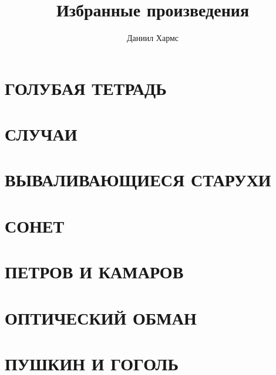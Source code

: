 \documentclass{article}
\begin{document}
\author{Даниил Хармс}
\title{Избранные произведения}
\date{}
\maketitle

\section{ГОЛУБАЯ ТЕТРАДЬ}

\section{СЛУЧАИ}
                 
\section{ВЫВАЛИВАЮЩИЕСЯ СТАРУХИ}
   
\section{СОНЕТ}
   
\section{ПЕТРОВ И КАМАРОВ}
   
\section{ОПТИЧЕСКИЙ ОБМАН}
  
\section{ПУШКИН И ГОГОЛЬ}
  
\end{document}
